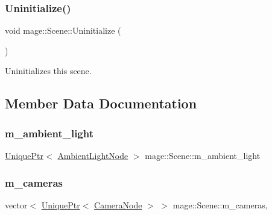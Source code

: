 \hypertarget{classmage_1_1_scene_a714dc33c04dc2b8e2cec93564905b174}{}\label{classmage_1_1_scene_a714dc33c04dc2b8e2cec93564905b174} 
\subsubsection{\texorpdfstring{Uninitialize()}{Uninitialize()}}
{\footnotesize\ttfamily void mage\+::\+Scene\+::\+Uninitialize (\begin{DoxyParamCaption}{ }\end{DoxyParamCaption})}

Uninitializes this scene. 

\subsection{Member Data Documentation}
\hypertarget{classmage_1_1_scene_a16cc4fd9d0299eb816b1c955ee7739b3}{}\label{classmage_1_1_scene_a16cc4fd9d0299eb816b1c955ee7739b3} 
\subsubsection{\texorpdfstring{m\+\_\+ambient\+\_\+light}{m\_ambient\_light}}
{\footnotesize\ttfamily \hyperlink{namespacemage_a3316d7143a973e37adf1110f2e80ca31}{Unique\+Ptr}$<$ \hyperlink{namespacemage_ab0783a7428706251f8561dc30a4d228d}{Ambient\+Light\+Node} $>$ mage\+::\+Scene\+::m\+\_\+ambient\+\_\+light\hspace{0.3cm}{\ttfamily [private]}}

\hypertarget{classmage_1_1_scene_a52cb8cd511304854e43c37fc0148bfea}{}\label{classmage_1_1_scene_a52cb8cd511304854e43c37fc0148bfea} 
\subsubsection{\texorpdfstring{m\+\_\+cameras}{m\_cameras}}
{\footnotesize\ttfamily vector$<$ \hyperlink{namespacemage_a3316d7143a973e37adf1110f2e80ca31}{Unique\+Ptr}$<$ \hyperlink{classmage_1_1_camera_node}{Camera\+Node} $>$ $>$ mage\+::\+Scene\+::m\+\_\+cameras\hspace{0.3cm}{\ttfamily [mutable]}, {\ttfamily [private]}}

